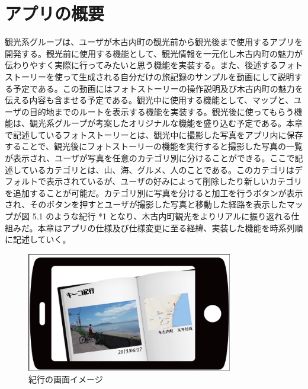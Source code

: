 \documentclass[openany,11pt,papersize]{jsbook}
\begin{document}
\section{アプリの概要}
観光系グループは、ユーザが木古内町の観光前から観光後まで使用するアプリを開発する。観光前に使用する機能として、観光情報を一元化し木古内町の魅力が伝わりやすく実際に行ってみたいと思う機能を実装する。また、後述するフォトストーリーを使って生成される自分だけの旅記録のサンプルを動画にして説明する予定である。この動画にはフォトストーリーの操作説明及び木古内町の魅力を伝える内容も含ませる予定である。観光中に使用する機能として、マップと、ユーザの目的地までのルートを表示する機能を実装する。観光後に使ってもらう機能は、観光系グループが考案したオリジナルな機能を盛り込む予定である。本章で記述しているフォトストーリーとは、観光中に撮影した写真をアプリ内に保存することで、観光後にフォトストーリーの機能を実行すると撮影した写真の一覧が表示され、ユーザが写真を任意のカテゴリ別に分けることができる。ここで記述しているカテゴリとは、山、海、グルメ、人のことである。このカテゴリはデフォルトで表示されているが、ユーザの好みによって削除したり新しいカテゴリを追加することが可能だ。カテゴリ別に写真を分けると加工を行うボタンが表示され、そのボタンを押すとユーザが撮影した写真と移動した経路を表示したマップが図 5.1 のような紀行 *1 となり、木古内町観光をよりリアルに振り返れる仕組みだ。本章はアプリの仕様及び仕様変更に至る経緯、実装した機能を時系列順に記述していく。



\begin{figure}[htbp]
 \begin{center}
\includegraphics[width=9cm, bb=0 0 857 498]{5.1_kikou.png}
 \end{center}
 \caption{紀行の画面イメージ}
 \label{fig:one}
\end{figure}
\end{document}
